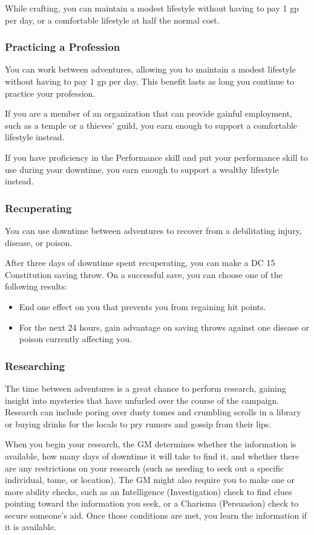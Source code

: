 While crafting, you can maintain a modest lifestyle without having to pay 1 gp per day, or a comfortable lifestyle at half the normal cost.

\subsubsection{Practicing a Profession}

You can work between adventures, allowing you to maintain a modest lifestyle without having to pay 1 gp per day. This benefit lasts as long you continue to practice your profession.

If you are a member of an organization that can provide gainful employment, such as a temple or a thieves' guild, you earn enough to support a comfortable lifestyle instead.

If you have proficiency in the Performance skill and put your performance skill to use during your downtime, you earn enough to support a wealthy lifestyle instead.

\subsubsection{Recuperating}

You can use downtime between adventures to recover from a debilitating injury, disease, or poison.

After three days of downtime spent recuperating, you can make a DC 15 Constitution saving throw. On a successful save, you can choose one of the following results:
\begin{itemize}
    \item End one effect on you that prevents you from regaining hit points.
    \item For the next 24 hours, gain advantage on saving throws against one disease or poison currently affecting you.
\end{itemize}
\subsubsection{Researching}

The time between adventures is a great chance to perform research, gaining insight into mysteries that have unfurled over the course of the campaign. Research can include poring over dusty tomes and crumbling scrolls in a library or buying drinks for the locals to pry rumors and gossip from their lips.

When you begin your research, the GM determines whether the information is available, how many days of downtime it will take to find it, and whether there are any restrictions on your research (such as needing to seek out a specific individual, tome, or location). The GM might also require you to make one or more ability checks, such as an Intelligence (Investigation) check to find clues pointing toward the information you seek, or a Charisma (Persuasion) check to secure someone's aid. Once those conditions are met, you learn the information if it is available.


